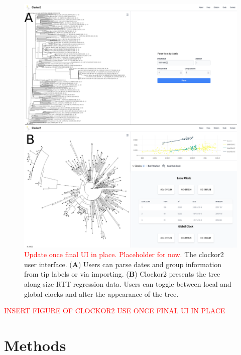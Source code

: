 \documentclass{article}
\begin{document}
\begin{figure}[H]
\centering
\includegraphics[width = 1\linewidth]{figures/clockor2UI.pdf}
\caption{\textcolor{red}{Update once final UI in place. Placeholder for now.} The clockor2 user interface. (\textbf{A}) Users can parse dates and group information from tip labels or via importing. (\textbf{B}) Clockor2 presents the tree along size RTT regression data. Users can toggle between local and global clocks and alter the appearance of the tree.}
\label{fig:ui}
\end{figure}

\textcolor{red}{INSERT FIGURE OF CLOCKOR2 USE ONCE FINAL UI IN PLACE}

\section*{Methods}
\end{document}
